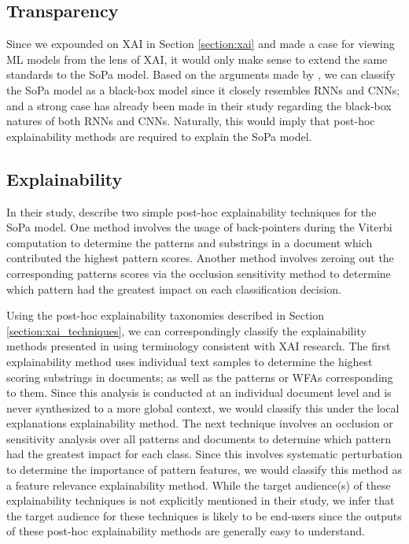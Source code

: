 \subsection{Transparency}

\label{section:sopa_transparency}

Since we expounded on XAI in Section \ref{section:xai} and made a case for
viewing ML models from the lens of XAI, it would only make sense to extend the
same standards to the SoPa model. Based on the arguments made by
\citet{arrieta2020explainable}, we can classify the SoPa model as a black-box
model since it closely resembles RNNs and CNNs; and a strong case has already
been made in their study regarding the black-box natures of both RNNs and CNNs.
Naturally, this would imply that post-hoc explainability methods are required to
explain the SoPa model.

\subsection{Explainability}

\label{section:sopa_post_hoc}

In their study, \citet[Page 7, Section 7]{schwartz2018sopa} describe two simple
post-hoc explainability techniques for the SoPa model. One method involves the
usage of back-pointers during the Viterbi computation to determine the patterns
and substrings in a document which contributed the highest pattern scores.
Another method involves zeroing out the corresponding patterns scores via the
occlusion sensitivity method to determine which pattern had the greatest impact
on each classification decision.

Using the post-hoc explainability taxonomies described in Section
\ref{section:xai_techniques}, we can correspondingly classify the explainability
methods presented in \citet{schwartz2018sopa} using terminology consistent with
XAI research. The first explainability method uses individual text samples to
determine the highest scoring substrings in documents; as well as the patterns
or WFAs corresponding to them. Since this analysis is conducted at an individual
document level and is never synthesized to a more global context, we would
classify this under the local explanations explainability method. The next
technique involves an occlusion or sensitivity analysis over all patterns and
documents to determine which pattern had the greatest impact for each class.
Since this involves systematic perturbation to determine the importance of
pattern features, we would classify this method as a feature relevance
explainability method. While the target audience(s) of these
explainability techniques is not explicitly mentioned in their study, we infer that
the target audience for these techniques is likely to be end-users since the
outputs of these post-hoc explainability methods are generally easy to understand.

